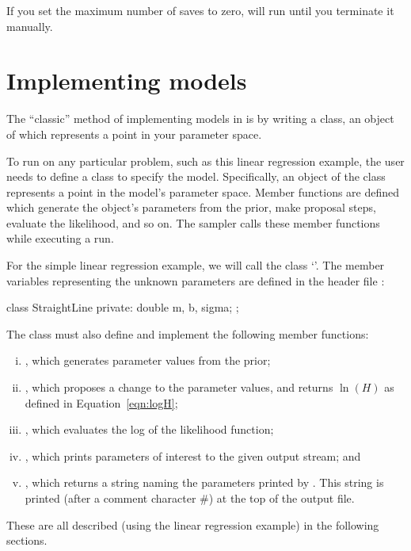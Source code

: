 \documentclass[article]{jss}
\begin{document}
If you set the maximum number of saves to zero,  will run until
you terminate it manually.

\section{Implementing models}\label{sec:models}
The ``classic'' method of implementing models in  is by
writing a  class, an object of which represents a
point in your parameter space.

To run  on any particular problem, such as this linear regression
example, the user needs to define a  class to specify the
model. Specifically, an object of the class represents a point in the
model's parameter space. Member functions are defined which generate
the object's parameters from the prior, make proposal steps, evaluate the
likelihood, and so on. The sampler calls these member functions while
executing a run.

For the simple linear regression example, we will call the class
`'. The member variables representing the
unknown parameters are defined in the header file :
%
\begin{CodeChunk}
\begin{CodeInput}
class StraightLine
{
    private:
        double m, b, sigma;
};
\end{CodeInput}
\end{CodeChunk}
%
The class must also define and implement the following member functions:
\begin{enumerate}[(i)]
\item {}, which generates parameter
        values from the prior;
\item {}, which proposes a
        change to the parameter values, and returns $\ln(H)$ as defined in
        Equation~\ref{eqn:logH};
\item {}, which evaluates the log of
        the likelihood function;
\item {}, which prints parameters of
        interest to the given output stream; and
\item {}, which returns a 
        string naming the parameters printed by .
        This string is printed (after a comment character \#) at the top of
        the output file.
\end{enumerate}
These are all described (using the linear regression example) in the
following sections.
\end{document}
